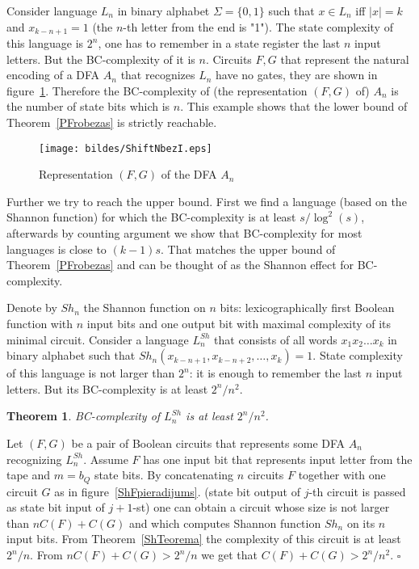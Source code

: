 \documentclass[copyright, creativecommons]{eptcs}
\newcommand{\qed}{$\square$}
\newtheorem{theorem}{Theorem}[section]
\newenvironment{proof}[1][Proof]{\begin{trivlist}
\item[\hskip \labelsep {\bfseries #1}]}{\end{trivlist}}
\begin{document}
Consider language $L_n$ in binary alphabet $\Sigma=\{0, 1\}$ such that $x\in L_n$
iff $|x|=k$ and $x_{k-n+1}=1$ (the $n$-th letter from the end is "1"). The state complexity
of this language is $2^n$, one has to remember in a state register the last $n$ input letters. But the BC-complexity of it is $n$.
Circuits $F, G$ that represent the natural encoding of a DFA $A_n$ that recognizes $L_n$ have no gates,
they are shown in figure~\ref{ShiftN}. Therefore the BC-complexity of (the representation $(F, G)$ of) $A_n$
is the number of state bits which is $n$.
This example shows that the lower bound of Theorem~\ref{PFrobezas} is strictly reachable.
\begin{figure}[htb]
	\centering
		\texttt{[image: bildes/ShiftNbezI.eps]}
	\caption{Representation $(F, G)$ of the DFA $A_n$}
	\label{ShiftN}
\end{figure}

Further we try to reach the upper bound. First we find a language
(based on the Shannon function) for which the BC-complexity is at least $s/\log^2(s)$,
afterwards by counting argument we show that BC-complexity for most
languages is close to $(k-1)s$. That matches the upper bound of Theorem~\ref{PFrobezas}
and can be thought of as the Shannon effect for BC-complexity.

Denote by $Sh_n$ the Shannon function on $n$ bits: lexicographically first Boolean function with $n$ input
bits and one output bit with maximal complexity of its minimal circuit.
Consider a language $L^{Sh}_n$ that consists of all words $x_1x_2\dots x_k$ in binary alphabet such that
$Sh_n(x_{k-n+1},x_{k-n+2},\dots,x_k)=1$. 
State complexity of this language is not larger than $2^n$: it is enough to remember the last $n$ input letters.
But its BC-complexity is at least $2^n/{n^2}$.

\begin{theorem}
\label{e2}
BC-complexity of $L^{Sh}_n$ is at least $2^n/n^2$.
\end{theorem}
\begin{proof}
Let $(F, G)$ be a pair of Boolean circuits that represents some DFA $A_n$ recognizing $L^{Sh}_n$.
Assume $F$ has one input bit that represents input letter from the tape and $m=b_Q$ state bits. 
By concatenating $n$ circuits $F$ together with one circuit $G$ as in figure~\ref{ShFpieradijums}.
(state bit output of $j$-th circuit is passed as state bit input
of $j+1$-st) one can obtain a circuit whose size is not larger than $nC(F)+C(G)$ and which
computes Shannon function $Sh_n$ on its $n$ input bits.
From Theorem~\ref{ShTeorema} the complexity of this circuit is at least $2^n/n$.
From $nC(F)+C(G)>2^n/n$ we get that $C(F)+C(G)>2^n/n^2$.
\qed
\end{proof}
\end{document}
